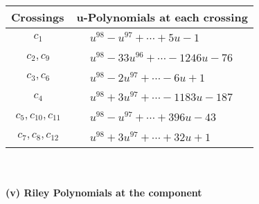 \documentclass[1p]{elsarticle_modified}
\theoremstyle{definition}
\begin{document}
\begin{tabular}{m{50pt}|m{274pt}}
Crossings & \hspace{64pt}u-Polynomials at each crossing \\
\hline $$\begin{aligned}c_{1}\end{aligned}$$&$\begin{aligned}
&u^{98}- u^{97}+\cdots+5 u-1
\end{aligned}$\\
\hline $$\begin{aligned}c_{2},c_{9}\end{aligned}$$&$\begin{aligned}
&u^{98}-33 u^{96}+\cdots-1246 u-76
\end{aligned}$\\
\hline $$\begin{aligned}c_{3},c_{6}\end{aligned}$$&$\begin{aligned}
&u^{98}-2 u^{97}+\cdots-6 u+1
\end{aligned}$\\
\hline $$\begin{aligned}c_{4}\end{aligned}$$&$\begin{aligned}
&u^{98}+3 u^{97}+\cdots-1183 u-187
\end{aligned}$\\
\hline $$\begin{aligned}c_{5},c_{10},c_{11}\end{aligned}$$&$\begin{aligned}
&u^{98}- u^{97}+\cdots+396 u-43
\end{aligned}$\\
\hline $$\begin{aligned}c_{7},c_{8},c_{12}\end{aligned}$$&$\begin{aligned}
&u^{98}+3 u^{97}+\cdots+32 u+1
\end{aligned}$\\
\hline
\end{tabular}\\~\\
\newpage\renewcommand{\arraystretch}{1}
\flushleft \textbf{(v) Riley Polynomials at the component}\newline \\
\end{document}
